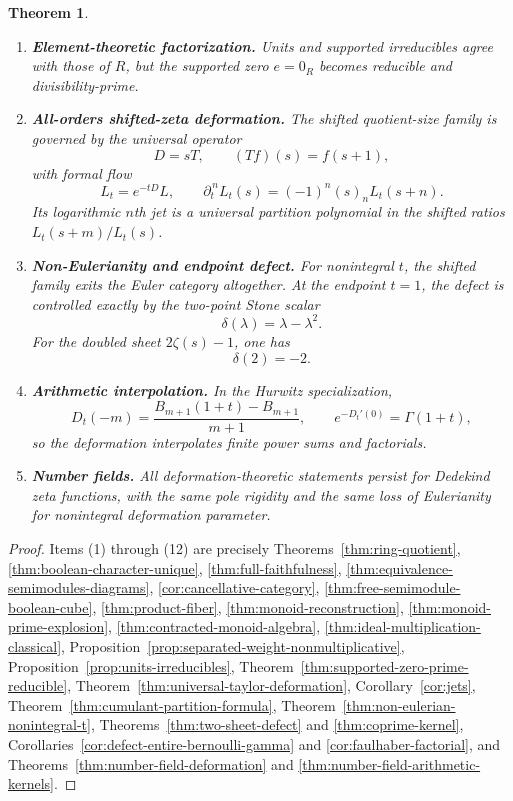 \documentclass[11pt]{amsart}
\numberwithin{equation}{section}
\newtheorem{theorem}{Theorem}[section]
\theoremstyle{definition}
\begin{document}
\begin{theorem}
\begin{enumerate}[label=(\arabic*)]
    \item \textbf{Element-theoretic factorization.}
    Units and supported irreducibles agree with those of $R$, but the supported zero $e=0_R$ becomes reducible and divisibility-prime.

    \item \textbf{All-orders shifted-zeta deformation.}
    The shifted quotient-size family is governed by the universal operator
    \[
    D=sT,
    \qquad
    (Tf)(s)=f(s+1),
    \]
    with formal flow
    \[
    L_t=e^{-tD}L,
    \qquad
    \partial_t^{\,n}L_t(s)=(-1)^n(s)_nL_t(s+n).
    \]
    Its logarithmic $n$th jet is a universal partition polynomial in the shifted ratios $L_t(s+m)/L_t(s)$.

    \item \textbf{Non-Eulerianity and endpoint defect.}
    For nonintegral $t$, the shifted family exits the Euler category altogether. At the endpoint $t=1$, the defect is controlled exactly by the two-point Stone scalar
    \[
    \delta(\lambda)=\lambda-\lambda^2.
    \]
    For the doubled sheet $2\zeta(s)-1$, one has
    \[
    \delta(2)=-2.
    \]

    \item \textbf{Arithmetic interpolation.}
    In the Hurwitz specialization,
    \[
    D_t(-m)=\frac{B_{m+1}(1+t)-B_{m+1}}{m+1},
    \qquad
    e^{-D_t'(0)}=\Gamma(1+t),
    \]
    so the deformation interpolates finite power sums and factorials.

    \item \textbf{Number fields.}
    All deformation-theoretic statements persist for Dedekind zeta functions, with the same pole rigidity and the same loss of Eulerianity for nonintegral deformation parameter.
\end{enumerate}
\end{theorem}

\begin{proof}
Items (1) through (12) are precisely Theorems~\ref{thm:ring-quotient}, \ref{thm:boolean-character-unique}, \ref{thm:full-faithfulness}, \ref{thm:equivalence-semimodules-diagrams}, \ref{cor:cancellative-category}, \ref{thm:free-semimodule-boolean-cube}, \ref{thm:product-fiber}, \ref{thm:monoid-reconstruction}, \ref{thm:monoid-prime-explosion}, \ref{thm:contracted-monoid-algebra}, \ref{thm:ideal-multiplication-classical}, Proposition~\ref{prop:separated-weight-nonmultiplicative}, Proposition~\ref{prop:units-irreducibles}, Theorem~\ref{thm:supported-zero-prime-reducible}, Theorem~\ref{thm:universal-taylor-deformation}, Corollary~\ref{cor:jets}, Theorem~\ref{thm:cumulant-partition-formula}, Theorem~\ref{thm:non-eulerian-nonintegral-t}, Theorems~\ref{thm:two-sheet-defect} and \ref{thm:coprime-kernel}, Corollaries~\ref{cor:defect-entire-bernoulli-gamma} and \ref{cor:faulhaber-factorial}, and Theorems~\ref{thm:number-field-deformation} and \ref{thm:number-field-arithmetic-kernels}. 
\end{proof}
\end{document}
